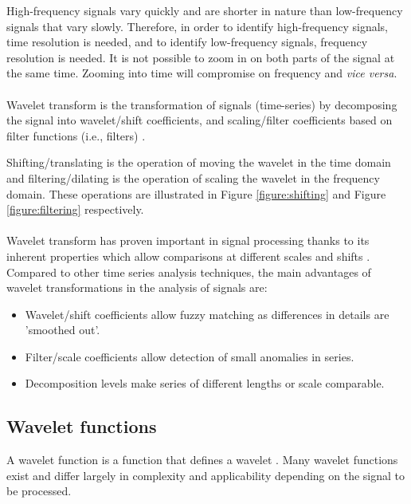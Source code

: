 High-frequency signals vary quickly and are shorter in nature than
low-frequency signals that vary slowly. Therefore, in order to identify
high-frequency signals, time resolution is needed, and to identify
low-frequency signals, frequency resolution is needed. It is not possible to
zoom in on both parts of the signal at the same time. Zooming into time will
compromise on frequency and \textit{vice versa}.

\paragraph{}
Wavelet transform is the transformation of signals (time-series) by
decomposing the signal into wavelet/shift coefficients, and scaling/filter
coefficients based on filter functions (i.e., filters) \cite{karus2013}.

Shifting/translating is the operation of moving the wavelet in the time domain
and filtering/dilating is the operation of scaling the wavelet in the frequency
domain. These operations are illustrated in Figure \ref{figure:shifting} and
Figure \ref{figure:filtering} respectively.


\vspace{1em}


\paragraph{}
Wavelet transform has proven important in signal processing thanks to its
inherent properties which allow comparisons at different scales and shifts
\cite{karus2013}. Compared to other time series analysis techniques, the main
advantages of wavelet transformations in the analysis of signals are:
\begin{itemize}
	\item Wavelet/shift coefficients allow fuzzy matching as differences in details
	are 'smoothed out'.
	\item Filter/scale coefficients allow detection of small anomalies in series.
	\item Decomposition levels make series of different lengths or scale
	comparable.
\end{itemize}

\subsection{Wavelet functions}
A wavelet function is a function that defines a wavelet \cite{wadkar}. Many
wavelet functions exist and differ largely in complexity and applicability
depending on the signal to be processed.

